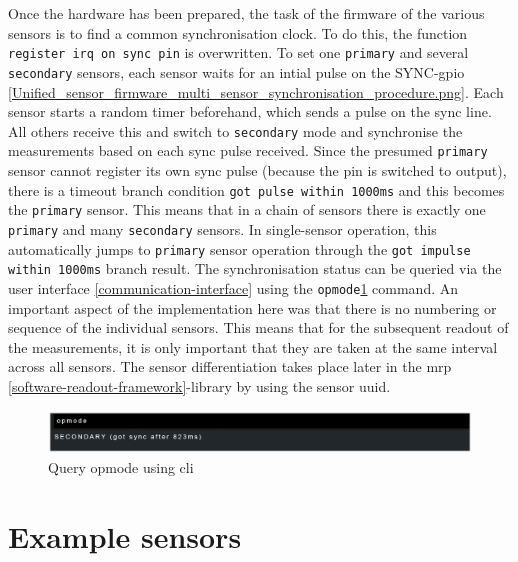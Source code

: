 Once the hardware has been prepared, the task of the firmware of the
various sensors is to find a common synchronisation clock. To do this,
the function \passthrough{\lstinline!register irq on sync pin!} is
overwritten. To set one \passthrough{\lstinline!primary!} and several
\passthrough{\lstinline!secondary!} sensors, each sensor waits for an
intial pulse on the SYNC-\gls{gpio}
\ref{Unified_sensor_firmware_multi_sensor_synchronisation_procedure.png}.
Each sensor starts a random timer beforehand, which sends a pulse on the
sync line. All others receive this and switch to
\passthrough{\lstinline!secondary!} mode and synchronise the
measurements based on each sync pulse received. Since the presumed
\passthrough{\lstinline!primary!} sensor cannot register its own sync
pulse (because the pin is switched to output), there is a timeout branch
condition \passthrough{\lstinline!got pulse within 1000ms!} and this
becomes the \passthrough{\lstinline!primary!} sensor. This means that in
a chain of sensors there is exactly one
\passthrough{\lstinline!primary!} and many
\passthrough{\lstinline!secondary!} sensors. In single-sensor operation,
this automatically jumps to \passthrough{\lstinline!primary!} sensor
operation through the
\passthrough{\lstinline!got impulse within 1000ms!} branch result. The
synchronisation status can be queried via the user interface
\ref{communication-interface} using the
\passthrough{\lstinline!opmode!}\ref{Query_opmode_using_(+cli).png}
command. An important aspect of the implementation here was that there
is no numbering or sequence of the individual sensors. This means that
for the subsequent readout of the measurements, it is only important
that they are taken at the same interval across all sensors. The sensor
differentiation takes place later in the \gls{mrp}
\ref{software-readout-framework}-library by using the sensor \gls{uuid}.

\begin{figure}
\centering
\includegraphics{./generated_images/border_Query_opmode_using_(+cli).png}
\caption{Query opmode using \gls{cli}
\label{Query_opmode_using_(+cli).png}}
\end{figure}

\hypertarget{example-sensors}{%
\section{Example sensors}\label{example-sensors}}


